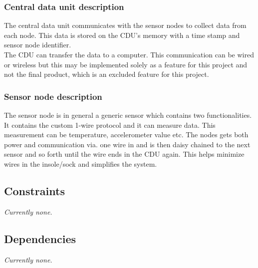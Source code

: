\subsubsection{Central data unit description}
The central data unit communicates with the sensor nodes to collect data from each node. This data is stored on the CDU's memory with a time stamp and sensor node identifier.\\
The CDU can transfer the data to a computer. This communication can be wired or wireless but this may be implemented solely as a feature for this project and not the final product, which is an excluded feature for this project.

\subsubsection{Sensor node description}
The sensor node is in general a generic sensor which contains two functionalities. It contains the custom 1-wire protocol and it can measure data. This measurement can be temperature, accelerometer value etc. The nodes gets both power and communication via. one wire in and is then daisy chained to the next sensor and so forth until the wire ends in the CDU again. This helps minimize wires in the insole/sock and simplifies the system. 

\subsection{Constraints}
\textit{Currently none.}
\subsection{Dependencies}
\textit{Currently none.}



